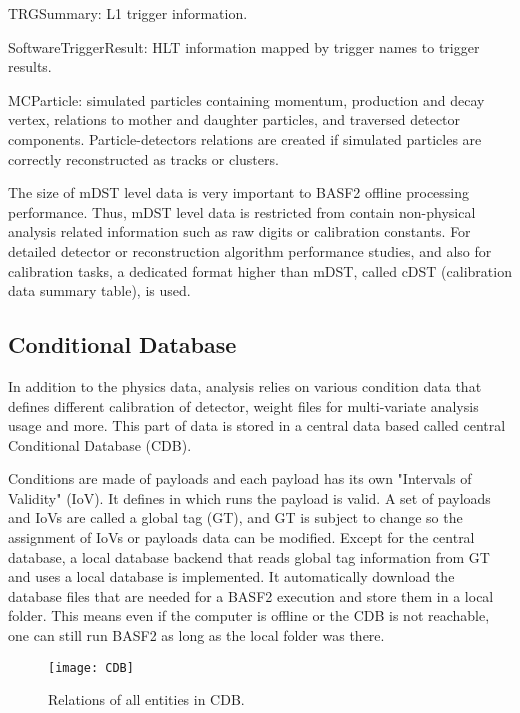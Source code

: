 \textbullet \space TRGSummary: L1 trigger information. 
 
\textbullet \space SoftwareTriggerResult: HLT information mapped by trigger names to trigger results. 

\textbullet \space  MCParticle: simulated particles containing 
momentum, production and decay vertex, relations
to mother and daughter particles, and traversed detector components. Particle-detectors relations are
created if simulated particles are correctly reconstructed as
tracks or clusters.

The size of mDST level data is very important to BASF2 offline processing performance. Thus, mDST level data is restricted from contain non-physical analysis related information such as raw digits or calibration constants. For detailed detector
or reconstruction algorithm performance studies, and also for calibration tasks, a dedicated format higher than mDST, called cDST 
(calibration data summary table), is used.
 

\subsection{Conditional Database}

In addition to the physics data, analysis relies on various condition data that defines different calibration of detector, weight files for multi-variate analysis usage and more. This part of data is stored in a central data based called central Conditional Database (CDB). 

Conditions are made of payloads and each payload has its own "Intervals of Validity" (IoV). It defines in which runs the payload is valid. A set of payloads and IoVs are called a global tag (GT), and GT is subject to change so the assignment of IoVs or payloads data can be modified. Except for the central database, a local database backend that reads global tag information from GT and uses a local database is implemented. It automatically download the database files that are needed for a BASF2 execution and store them in a local folder. This means even if the computer is offline or the CDB is not reachable, one can still run BASF2 as long as the local folder was there. 

\begin{figure}[htbp]
	\centering
	\texttt{[image: CDB]}
	\caption{ Relations of all entities in CDB. \cite{BASF2} }
\end{figure}

